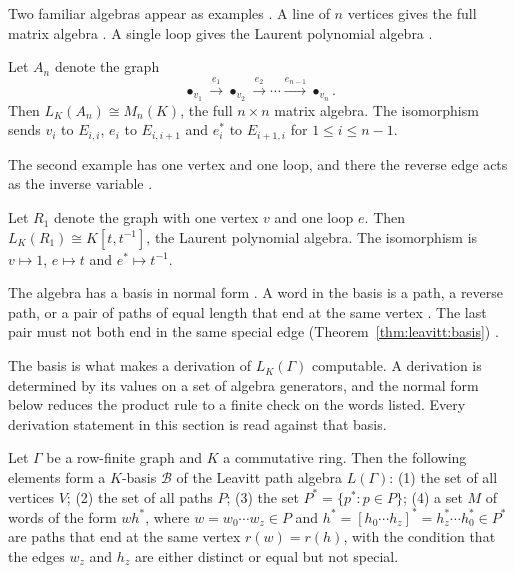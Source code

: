 Two familiar algebras appear as examples \cite[p.~61]{Lopatkin2019}. A line of
$n$ vertices gives the full matrix algebra \cite[p.~61]{Lopatkin2019}. A
single loop gives the Laurent polynomial algebra \cite[p.~61]{Lopatkin2019}.

\begin{example}\label{ex:leavitt:matrix}
Let $A_{n}$ denote the graph
\begin{equation*}
\bullet_{v_{1}}\xrightarrow{e_{1}}\bullet_{v_{2}}\xrightarrow{e_{2}}\cdots
\xrightarrow{e_{n-1}}\bullet_{v_{n}} .
\end{equation*}
Then $L_{K}(A_{n})\cong M_{n}(K)$, the full $n\times n$ matrix algebra. The
isomorphism sends $v_{i}$ to $E_{i,i}$, $e_{i}$ to $E_{i,i+1}$ and $e^{*}_{i}$ to
$E_{i+1,i}$ for $1\le i\le n-1$.
\end{example}

The second example has one vertex and one loop, and there the reverse edge
acts as the inverse variable \cite[p.~61]{Lopatkin2019}.

\begin{example}\label{ex:leavitt:laurent}
Let $R_{1}$ denote the graph with one vertex $v$ and one loop $e$. Then
$L_{K}(R_{1})\cong K[t,t^{-1}]$, the Laurent polynomial algebra. The isomorphism is
$v\mapsto 1$, $e\mapsto t$ and $e^{*}\mapsto t^{-1}$.
\end{example}

The algebra has a basis in normal form \cite[p.~63]{Lopatkin2019}. A word in
the basis is a path, a reverse path, or a pair of paths of equal length that
end at the same vertex \cite[p.~63]{Lopatkin2019}. The last pair must not both
end in the same special edge (Theorem~\ref{thm:leavitt:basis})
\cite[p.~63]{Lopatkin2019}.

The basis is what makes a derivation of $L_K(\Gamma)$ computable. A derivation
is determined by its values on a set of algebra generators, and the normal
form below reduces the product rule to a finite check on the words listed.
Every derivation statement in this section is read against that basis.

\begin{theorem}\label{thm:leavitt:basis}
Let $\Gamma$ be a row-finite graph and $K$ a commutative ring. Then the following
elements form a $K$-basis $\mathcal B$ of the Leavitt path algebra $L(\Gamma)$:
(1) the set of all vertices $V$; (2) the set of all paths $P$; (3) the set
$P^{*}=\{p^{*}\colon p\in P\}$; (4) a set $M$ of words of the form $wh^{*}$, where
$w=w_{0}\cdots w_{z}\in P$ and $h^{*}=[h_{0}\cdots h_{z}]^{*}=h^{*}_{z}\cdots h^{*}_{0}\in P^{*}$
are paths that end at the same vertex $r(w)=r(h)$, with the condition that the edges
$w_{z}$ and $h_{z}$ are either distinct or equal but not special.
\end{theorem}

